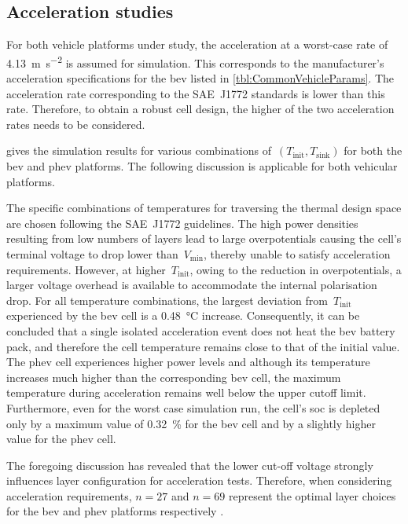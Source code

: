 \subsection{Acceleration studies}

For both vehicle platforms under study, the acceleration at a worst-case rate of
\SI{4.13}{\meter\per\second\squared} is assumed for simulation. This corresponds
to the  manufacturer's acceleration specifications  for the \gls{bev}  listed in
\cref{tbl:CommonVehicleParams}.  The  acceleration  rate  corresponding  to  the
SAE~J1772 standards is lower than this  rate. Therefore, to obtain a robust cell
design, the higher of the two acceleration rates needs to be considered.

  gives the  simulation  results  for various  combinations
of~${(T_\text{init},  T_\text{sink})}$  for  both the  \gls{bev}  and  \gls{phev}
platforms. The following discussion is applicable for both vehicular platforms.



The  specific combinations  of temperatures  for traversing  the thermal  design
space are  chosen following the  SAE~J1772 guidelines. The high  power densities
resulting from  low numbers of layers  lead to large overpotentials  causing the
cell's terminal  voltage to  drop lower than~$V_\text{min}$, thereby  unable to
satisfy acceleration requirements. However,  at higher~$T_\text{init}$, owing to
the  reduction in  overpotentials, a  larger  voltage overhead  is available  to
accommodate the  internal polarisation  drop. For all  temperature combinations,
the largest deviation from~$T_\text{init}$  experienced by the \gls{bev} cell is
a \SI{0.48}{\degreeCelsius} increase.  Consequently, it can be  concluded that a
single isolated acceleration event does not heat the \gls{bev} battery pack, and
therefore the cell  temperature remains close to that of  the initial value. The
\gls{phev} cell  experiences higher  power levels  and although  its temperature
increases  much  higher  than  the corresponding  \gls{bev}  cell,  the  maximum
temperature  during acceleration  remains  well below  the  upper cutoff  limit.
Furthermore, even  for the worst  case simulation  run, the cell's  \gls{soc} is
depleted only by  a maximum value of \SI{0.32}{\percent} for  the \gls{bev} cell
and by a slightly higher value for the \gls{phev} cell.

The foregoing  discussion has revealed  that the lower cut-off  voltage strongly
influences  layer   configuration  for   acceleration  tests.   Therefore,  when
considering acceleration requirements, ${n = 27}$ and ${n=69}$ represent the optimal
layer choices for the \gls{bev} and \gls{phev} platforms respectively .

